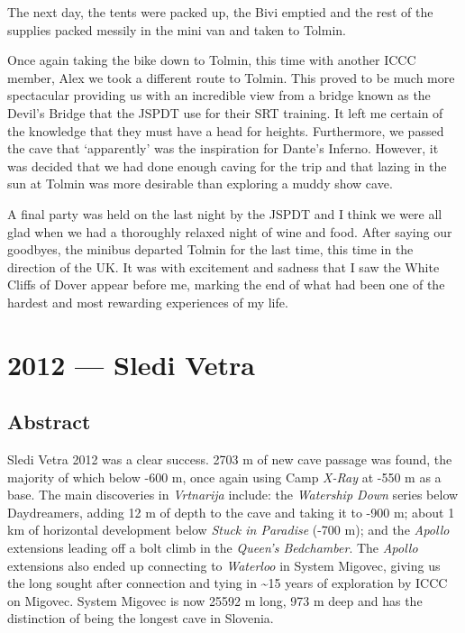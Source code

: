 The next day, the tents were packed up, the Bivi emptied and the rest of
the supplies packed messily in the mini van and taken to Tolmin.

Once again taking the bike down to Tolmin, this time with another ICCC
member, Alex we took a different route to Tolmin. This proved to be much
more spectacular providing us with an incredible view from a bridge
known as the Devil's Bridge that the JSPDT use for their SRT training.
It left me certain of the knowledge that they must have a head for
heights. Furthermore, we passed the cave that `apparently' was the
inspiration for Dante's Inferno. However, it was decided that we had
done enough caving for the trip and that lazing in the sun at Tolmin was
more desirable than exploring a muddy show cave.

A final party was held on the last night by the JSPDT and I think we
were all glad when we had a thoroughly relaxed night of wine and food.
After saying our goodbyes, the minibus departed Tolmin for the last
time, this time in the direction of the UK. It was with excitement and
sadness that I saw the White Cliffs of Dover appear before me, marking
the end of what had been one of the hardest and most rewarding
experiences of my life.

\hypertarget{sledi-vetra}{%
\chapter{2012 --- Sledi Vetra}\label{sledi-vetra}}

\hypertarget{abstract}{%
\section{Abstract}\label{abstract}}

Sledi Vetra 2012 was a clear success. 2703 m of new cave passage was
found, the majority of which below -600 m, once again using Camp
\emph{X-Ray} at -550 m as a base. The main discoveries in
\emph{Vrtnarija} include: the \emph{Watership Down} series below
Daydreamers, adding 12 m of depth to the cave and taking it to -900 m;
about 1 km of horizontal development below \emph{Stuck in Paradise}
(-700 m); and the \emph{Apollo} extensions leading off a bolt climb in
the \emph{Queen's Bedchamber}. The \emph{Apollo} extensions also ended
up connecting to \emph{Waterloo} in System Migovec, giving us the long
sought after connection and tying in \textasciitilde 15 years of
exploration by ICCC on Migovec. System Migovec is now 25592 m long, 973
m deep and has the distinction of being the longest cave in Slovenia.

